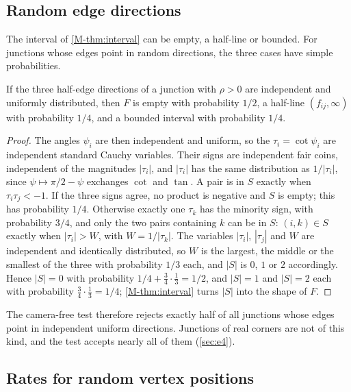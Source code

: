 \subsection{Random edge directions}\label{sec:Srandom}

The interval of \cref{M-thm:interval} can be empty, a half-line or bounded. For junctions whose edges point in random directions, the three cases have simple probabilities.

\begin{proposition}\label{prop:random}
If the three half-edge directions of a junction with $\rho>0$ are independent and uniformly distributed, then $F$ is empty with probability $1/2$, a half-line $(f_{ij},\infty)$ with probability $1/4$, and a bounded interval with probability $1/4$.
\end{proposition}
\begin{proof}
The angles $\psi_i$ are then independent and uniform, so the $\tau_i=\cot\psi_i$ are independent standard Cauchy variables. Their signs are independent fair coins, independent of the magnitudes $|\tau_i|$, and $|\tau_i|$ has the same distribution as $1/|\tau_i|$, since $\psi\mapsto\pi/2-\psi$ exchanges $\cot$ and $\tan$. A pair is in $S$ exactly when $\tau_i\tau_j<-1$. If the three signs agree, no product is negative and $S$ is empty; this has probability $1/4$. Otherwise exactly one $\tau_k$ has the minority sign, with probability $3/4$, and only the two pairs containing $k$ can be in $S$: $(i,k)\in S$ exactly when $|\tau_i|>W$, with $W=1/|\tau_k|$. The variables $|\tau_i|$, $|\tau_j|$ and $W$ are independent and identically distributed, so $W$ is the largest, the middle or the smallest of the three with probability $1/3$ each, and $|S|$ is $0$, $1$ or $2$ accordingly. Hence $|S|=0$ with probability $1/4+\tfrac34\cdot\tfrac13=1/2$, and $|S|=1$ and $|S|=2$ each with probability $\tfrac34\cdot\tfrac13=1/4$; \cref{M-thm:interval} turns $|S|$ into the shape of $F$.
\end{proof}

The camera-free test therefore rejects exactly half of all junctions whose edges point in independent uniform directions. Junctions of real corners are not of this kind, and the test accepts nearly all of them (\cref{sec:e4}).

\subsection{Rates for random vertex positions}\label{sec:Srate}

